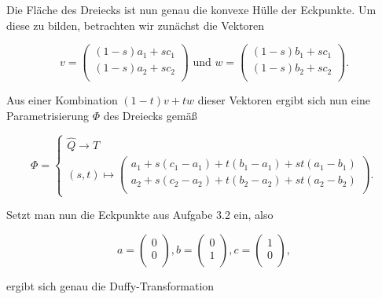\documentclass[a4paper,11pt,bibliography=totoc,listof=totoc,headinclude=true,cleardoublepage=empty,oneside]{scrbook}
\begin{document}
\noindent Die Fläche des Dreiecks ist nun genau die konvexe Hülle der Eckpunkte. Um diese zu bilden, betrachten wir zunächst die Vektoren  

\begin{equation*}
	v=\left(
	\begin{array}{ccc}
	(1-s)a_1+ sc_1\\
	(1-s)a_2+sc_2\\
	\end{array}
	\right) \text{ und } w=\left(
	\begin{array}{ccc}
	(1-s)b_1+ sc_1\\
	(1-s)b_2+sc_2\\
	\end{array}
	\right). 
\end{equation*}

\noindent Aus einer Kombination $(1-t)v+tw$ dieser Vektoren ergibt sich nun eine Parametrisierung $\Phi$ des Dreiecks gemäß 

\begin{equation*}
	\Phi = \begin{cases} 
	\hat{Q} \to T \\
	(s,t) \mapsto \left(
	\begin{array}{ccc}
	a_1 + s(c_1-a_1)+ t(b_1-a_1) + st(a_1-b_1)\\
	a_2 + s(c_2-a_2) + t(b_2-a_2) + st(a_2-b_2)\\
	\end{array}
	\right).
	\end{cases}
\end{equation*}


\noindent Setzt man nun die Eckpunkte  aus Aufgabe 3.2 ein, also 

\begin{equation*}
	a=\left(
	\begin{array}{ccc}
	0 \\
	0\\
	\end{array}
	\right), b=\left(
	\begin{array}{ccc}
	0 \\
	1\\
	\end{array}
	\right), c=\left(
	\begin{array}{ccc}
	1\\
	0\\
	\end{array}
	\right),
\end{equation*}

\noindent ergibt sich genau die  Duffy-Transformation
\end{document}
